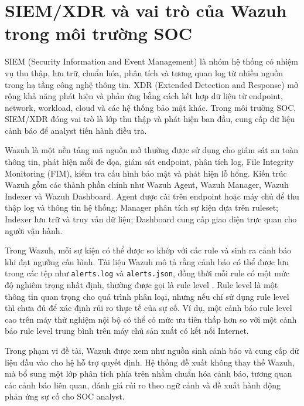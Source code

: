 \documentclass[a4paper,12pt,oneside]{book}
\begin{document}
\section{SIEM/XDR và vai trò của Wazuh trong môi trường SOC}
{\fontsize{13pt}{15.6pt}\selectfont

SIEM (Security Information and Event Management) là nhóm hệ thống có nhiệm vụ thu thập, lưu trữ, chuẩn hóa, phân tích và tương quan log từ nhiều nguồn trong hạ tầng công nghệ thông tin. XDR (Extended Detection and Response) mở rộng khả năng phát hiện và phản ứng bằng cách kết hợp dữ liệu từ endpoint, network, workload, cloud và các hệ thống bảo mật khác. Trong môi trường SOC, SIEM/XDR đóng vai trò là lớp thu thập và phát hiện ban đầu, cung cấp dữ liệu cảnh báo để analyst tiến hành điều tra.

\noindent Wazuh là một nền tảng mã nguồn mở thường được sử dụng cho giám sát an toàn thông tin, phát hiện mối đe dọa, giám sát endpoint, phân tích log, File Integrity Monitoring (FIM), kiểm tra cấu hình bảo mật và phát hiện lỗ hổng. Kiến trúc Wazuh gồm các thành phần chính như Wazuh Agent, Wazuh Manager, Wazuh Indexer và Wazuh Dashboard. Agent được cài trên endpoint hoặc máy chủ để thu thập log và thông tin hệ thống; Manager phân tích sự kiện dựa trên ruleset; Indexer lưu trữ và truy vấn dữ liệu; Dashboard cung cấp giao diện trực quan cho người vận hành.

\noindent Trong Wazuh, mỗi sự kiện có thể được so khớp với các rule và sinh ra cảnh báo khi đạt ngưỡng cấu hình. Tài liệu Wazuh mô tả rằng cảnh báo có thể được lưu trong các tệp như \texttt{alerts.log} và \texttt{alerts.json}, đồng thời mỗi rule có một mức độ nghiêm trọng nhất định, thường được gọi là rule level \cite{wazuhAlertManagement,wazuhRules}. Rule level là một thông tin quan trọng cho quá trình phân loại, nhưng nếu chỉ sử dụng rule level thì chưa đủ để xác định rủi ro thực tế của sự cố. Ví dụ, một cảnh báo rule level cao trên máy thử nghiệm nội bộ có thể có mức ưu tiên thấp hơn so với một cảnh báo rule level trung bình trên máy chủ sản xuất có kết nối Internet.

\noindent Trong phạm vi đề tài, Wazuh được xem như nguồn sinh cảnh báo và cung cấp dữ liệu đầu vào cho hệ hỗ trợ quyết định. Hệ thống đề xuất không thay thế Wazuh, mà bổ sung một lớp phân tích phía trên nhằm chuẩn hóa cảnh báo, tương quan các cảnh báo liên quan, đánh giá rủi ro theo ngữ cảnh và đề xuất hành động phản ứng sự cố cho SOC analyst.

}
\end{document}
